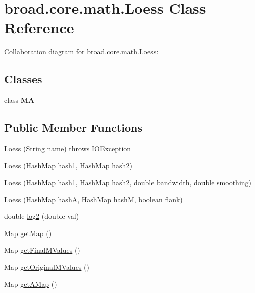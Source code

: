 \hypertarget{classbroad_1_1core_1_1math_1_1_loess}{\section{broad.\+core.\+math.\+Loess Class Reference}
\label{classbroad_1_1core_1_1math_1_1_loess}
}


Collaboration diagram for broad.\+core.\+math.\+Loess\+:
\subsection*{Classes}
\begin{DoxyCompactItemize}
\item 
class {\bfseries M\+A}
\end{DoxyCompactItemize}
\subsection*{Public Member Functions}
\begin{DoxyCompactItemize}
\item 
\hyperlink{classbroad_1_1core_1_1math_1_1_loess_abb08811372cb83a6473c7056908098dd}{Loess} (String name)  throws I\+O\+Exception
\item 
\hyperlink{classbroad_1_1core_1_1math_1_1_loess_aab7cc384323218584f17e330db3b6ee7}{Loess} (Hash\+Map hash1, Hash\+Map hash2)
\item 
\hyperlink{classbroad_1_1core_1_1math_1_1_loess_ab420cc1544855ae23e5aa6f0de9d4fa7}{Loess} (Hash\+Map hash1, Hash\+Map hash2, double bandwidth, double smoothing)
\item 
\hyperlink{classbroad_1_1core_1_1math_1_1_loess_a930a7d6f5834b593e3479ad9e7102e95}{Loess} (Hash\+Map hash\+A, Hash\+Map hash\+M, boolean flank)
\item 
double \hyperlink{classbroad_1_1core_1_1math_1_1_loess_a42bcd0bb764afe115ebaeff91d7a2ce3}{log2} (double val)
\item 
Map \hyperlink{classbroad_1_1core_1_1math_1_1_loess_a8e87a9e6008cd998fab086f8477498e8}{get\+Map} ()
\item 
Map \hyperlink{classbroad_1_1core_1_1math_1_1_loess_a362409d5ac365910ed12a2859a2442fe}{get\+Final\+M\+Values} ()
\item 
Map \hyperlink{classbroad_1_1core_1_1math_1_1_loess_a4a20d061bf64133e8364fc0bdf5630ba}{get\+Original\+M\+Values} ()
\item 
Map \hyperlink{classbroad_1_1core_1_1math_1_1_loess_a068ab174f57253dd822cc82776aec672}{get\+A\+Map} ()
\end{DoxyCompactItemize}
